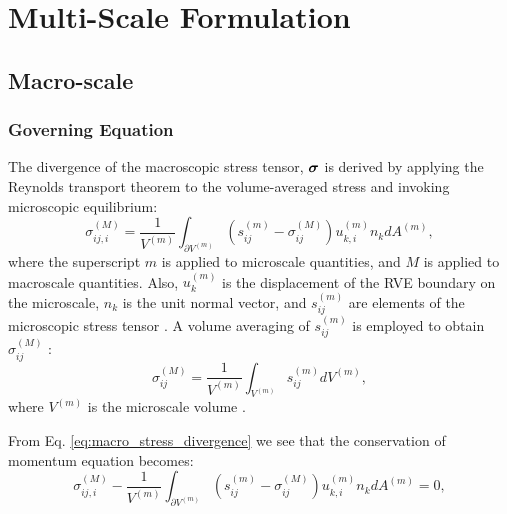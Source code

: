 \chapter{Multi-Scale Formulation}

\section{Macro-scale}

\subsection{Governing Equation}

The divergence of the macroscopic stress tensor, $\bm{\sigma}$ is derived by applying the Reynolds transport theorem to the volume-averaged stress and invoking microscopic equilibrium:
%
\begin{equation}
\sigma_{ij,i}^{(M)} = \frac{1}{V^{(m)}} \int_{\partial V^{(m)}} \left( s_{ij}^{(m)} - \sigma_{ij}^{(M)} \right)u_{k,i}^{(m)} n_k dA^{(m)},
\label{eq:macro_stress_divergence}
\end{equation}
%
where the superscript \(m\) is applied to microscale quantities, and \(M\) is applied to macroscale quantities. Also, $u_k^{(m)}$ is the displacement of the RVE boundary on the microscale, $n_k$ is the unit normal vector, and $s_{ij}^{(m)}$ are elements of the microscopic stress tensor \cite{Chandran:2007hy,Stylianopoulos:2007dp}. A volume averaging of $s_{ij}^{(m)}$ is employed to obtain $\sigma_{ij}^{(M)}$ :
%
\begin{equation}
\sigma_{ij}^{(M)} = \frac{1}{V^{(m)}}\int_{V^{(m)}}s_{ij}^{(m)} dV^{(m)},
\label{eq:macro_stress_volume_avg}
\end{equation}
%
where $V^{(m)}$ is the microscale volume \cite{Chandran:2007hy}. 

From Eq. \eqref{eq:macro_stress_divergence} we see that the conservation of momentum equation becomes:
\begin{equation}
\sigma_{ij,i}^{(M)}-\frac{1}{V^{(m)}} \int_{\partial V^{(m)}} \left( s_{ij}^{(m)} - \sigma_{ij}^{(M)} \right)u_{k,i}^{(m)} n_k dA^{(m)}=0,
\label{eq:multi_cons_mom}
\end{equation}


